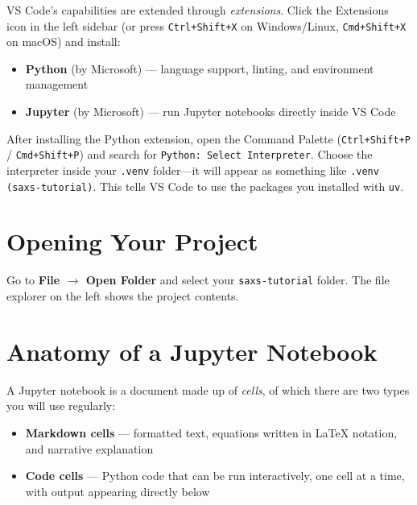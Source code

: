 \documentclass[nobib]{tufte-book}
\begin{document}
VS Code's capabilities are extended through \emph{extensions}.
Click the Extensions icon in the left sidebar (or press
\texttt{Ctrl+Shift+X} on Windows/Linux, \texttt{Cmd+Shift+X} on macOS)
and install:

\begin{itemize}
    \item \textbf{Python} (by Microsoft) --- language support, linting, and
          environment management
    \item \textbf{Jupyter} (by Microsoft) --- run Jupyter notebooks directly
          inside VS Code
\end{itemize}

After installing the Python extension, open the Command Palette
(\texttt{Ctrl+Shift+P} / \texttt{Cmd+Shift+P}) and search for
\texttt{Python: Select Interpreter}.
Choose the interpreter inside your \texttt{.venv} folder---it will appear
as something like \texttt{.venv (saxs-tutorial)}.
This tells VS Code to use the packages you installed with \texttt{uv}.

\section{Opening Your Project}

Go to \textbf{File $\rightarrow$ Open Folder} and select your
\texttt{saxs-tutorial} folder.
The file explorer on the left shows the project contents.

\section{Anatomy of a Jupyter Notebook}

A Jupyter notebook is a document made up of \emph{cells}, of which there
are two types you will use regularly:

\begin{itemize}
    \item \textbf{Markdown cells} --- formatted text, equations written in
          \LaTeX{} notation, and narrative explanation
    \item \textbf{Code cells} --- Python code that can be run interactively,
          one cell at a time, with output appearing directly below
\end{itemize}
\end{document}
